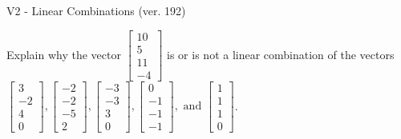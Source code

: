 \begin{exercise}
  \begin{exerciseTitle}V2 - Linear Combinations (ver. 192)\end{exerciseTitle}
  \begin{exerciseStatement}
    Explain why the vector \(\left[\begin{array}{c}
10 \\
5 \\
11 \\
-4
\end{array}\right]\)  is or is not a linear 
	combination of the vectors \(\left[\begin{array}{c}
3 \\
-2 \\
4 \\
0
\end{array}\right] , \left[\begin{array}{c}
-2 \\
-2 \\
-5 \\
2
\end{array}\right] , \left[\begin{array}{c}
-3 \\
-3 \\
3 \\
0
\end{array}\right] , \left[\begin{array}{c}
0 \\
-1 \\
-1 \\
-1
\end{array}\right] , \text{ and } \left[\begin{array}{c}
1 \\
1 \\
1 \\
0
\end{array}\right]\).
	



\end{exerciseStatement}
\end{exercise}
